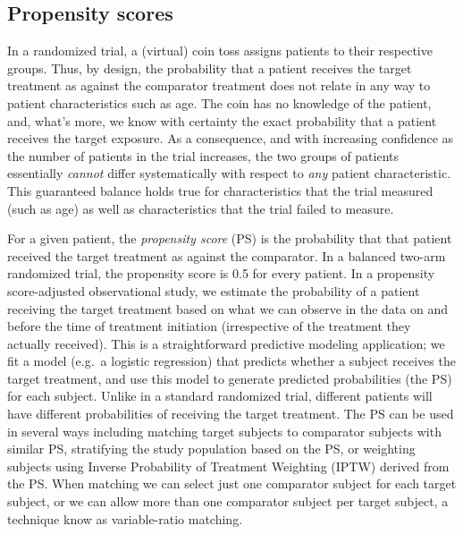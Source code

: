 \documentclass[11pt]{book}
\theoremstyle{definition}
\theoremstyle{definition}
\theoremstyle{definition}
\theoremstyle{remark}
\begin{document}
\hypertarget{propensity-scores}{%
\subsection{Propensity scores}\label{propensity-scores}}


In a randomized trial, a (virtual) coin toss assigns patients to their respective groups. Thus, by design, the probability that a patient receives the target treatment as against the comparator treatment does not relate in any way to patient characteristics such as age. The coin has no knowledge of the patient, and, what's more, we know with certainty the exact probability that a patient receives the target exposure. As a consequence, and with increasing confidence as the number of patients in the trial increases, the two groups of patients essentially \emph{cannot} differ systematically with respect to \emph{any} patient characteristic. This guaranteed balance holds true for characteristics that the trial measured (such as age) as well as characteristics that the trial failed to measure. 

For a given patient, the \emph{propensity score} (PS) is the probability that that patient received the target treatment as against the comparator. \citep{rosenbaum_1983} In a balanced two-arm randomized trial, the propensity score is 0.5 for every patient. In a propensity score-adjusted observational study, we estimate the probability of a patient receiving the target treatment based on what we can observe in the data on and before the time of treatment initiation (irrespective of the treatment they actually received). This is a straightforward predictive modeling application; we fit a model (e.g.~a logistic regression) that predicts whether a subject receives the target treatment, and use this model to generate predicted probabilities (the PS) for each subject. Unlike in a standard randomized trial, different patients will have different probabilities of receiving the target treatment. The PS can be used in several ways including matching target subjects to comparator subjects with similar PS, stratifying the study population based on the PS, or weighting subjects using Inverse Probability of Treatment Weighting (IPTW) derived from the PS. When matching we can select just one comparator subject for each target subject, or we can allow more than one comparator subject per target subject, a technique know as variable-ratio matching. \citep{rassen_2012}      
\end{document}
